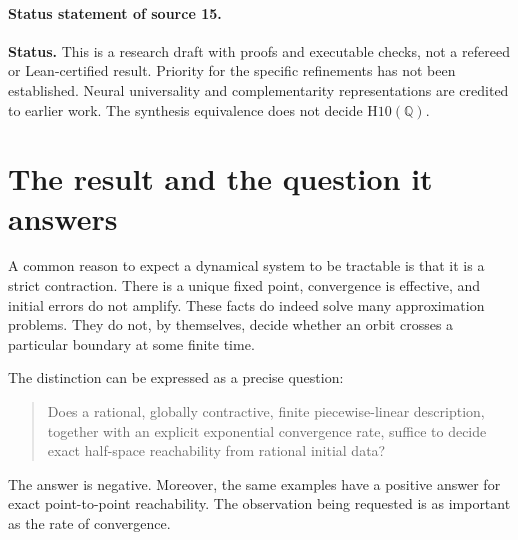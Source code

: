 \documentclass[11pt,letterpaper]{article}
\numberwithin{equation}{section}
\theoremstyle{definition}
\theoremstyle{remark}
\newcommand{\Q}{\mathbb Q}
\newcommand{\srcmark}[1]{\par\noindent{\small\itshape [source~#1]}\par}
\begin{document}
\paragraph{Status statement of source 15.}
\textbf{Status.} This is a research draft with proofs and executable checks, not a
refereed or Lean-certified result. Priority for the specific refinements has not
been established. Neural universality and complementarity representations are
credited to earlier work. The synthesis equivalence does not decide
$\mathrm{H10}(\Q)$.

\section{The result and the question it answers}\label{pqc:sc:sec:intro}
\srcmark{14}

A common reason to expect a dynamical system to be tractable is that it is a
strict contraction. There is a unique fixed point, convergence is effective,
and initial errors do not amplify. These facts do indeed solve many
approximation problems. They do not, by themselves, decide whether an orbit
crosses a particular boundary at some finite time.

The distinction can be expressed as a precise question:
\begin{quote}
Does a rational, globally contractive, finite piecewise-linear description,
together with an explicit exponential convergence rate, suffice to decide
exact half-space reachability from rational initial data?
\end{quote}
The answer is negative. Moreover, the same examples have a positive answer
for exact point-to-point reachability. The observation being requested is
as important as the rate of convergence.
\end{document}

